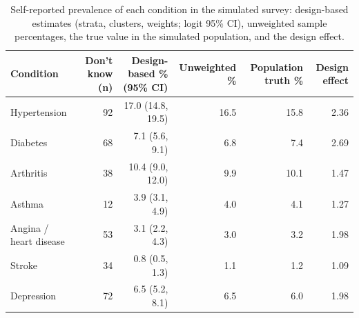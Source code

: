 \begin{table}

\caption{\label{tab:tab_condition_prevalence}Self-reported prevalence of each condition in the simulated survey: design-based estimates (strata, clusters, weights; logit 95\% CI), unweighted sample percentages, the true value in the simulated population, and the design effect.}
\centering
\begin{tabular}[t]{lrrrrr}
\toprule
Condition & Don't know (n) & Design-based \% (95\% CI) & Unweighted \% & Population truth \% & Design effect\\
\midrule
Hypertension & 92 & 17.0 (14.8, 19.5) & 16.5 & 15.8 & 2.36\\
Diabetes & 68 & 7.1 (5.6, 9.1) & 6.8 & 7.4 & 2.69\\
Arthritis & 38 & 10.4 (9.0, 12.0) & 9.9 & 10.1 & 1.47\\
Asthma & 12 & 3.9 (3.1, 4.9) & 4.0 & 4.1 & 1.27\\
Angina / heart disease & 53 & 3.1 (2.2, 4.3) & 3.0 & 3.2 & 1.98\\
Stroke & 34 & 0.8 (0.5, 1.3) & 1.1 & 1.2 & 1.09\\
Depression & 72 & 6.5 (5.2, 8.1) & 6.5 & 6.0 & 1.98\\
\bottomrule
\end{tabular}
\end{table}
